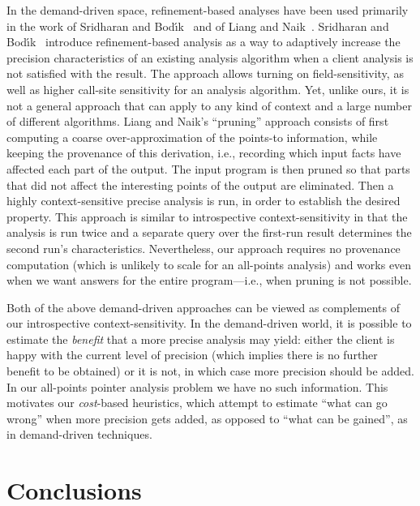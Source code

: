 In the demand-driven space, refinement-based analyses have been used
primarily in the work of Sridharan and Bod\'{\i}k~\cite{pldi:2006:Sridharan} and
of Liang and Naik~\cite{pldi:2011:Liang}.  Sridharan
and Bod\'{\i}k~\cite{pldi:2006:Sridharan} introduce refinement-based analysis as a
way to adaptively increase the precision characteristics of an
existing analysis algorithm when a client analysis is not satisfied
with the result. The approach allows turning on field-sensitivity, as
well as higher call-site sensitivity for an analysis algorithm. Yet,
unlike ours, it is not a general approach that can apply to any kind
of context and a large number of different algorithms.  Liang and
Naik's ``pruning'' approach \cite{pldi:2011:Liang}
consists of first computing a coarse over-approximation of the
points-to information, while keeping the provenance of this
derivation, i.e., recording which input facts have affected each part
of the output. The input program is then pruned so that parts that did
not affect the interesting points of the output are eliminated. Then a
highly context-sensitive precise analysis is run, in order to
establish the desired property. This approach is similar to
introspective context-sensitivity in that the analysis is run twice
and a separate query over the first-run result determines the second
run's characteristics.  Nevertheless, our approach requires no
provenance computation (which is unlikely to scale for an all-points
analysis) and works even when we want answers for the entire
program---i.e., when pruning is not possible.

Both of the above demand-driven approaches can be viewed as
complements of our introspective context-sensitivity. In the
demand-driven world, it is possible to estimate the \emph{benefit}
that a more precise analysis may yield: either the client is happy
with the current level of precision (which implies there is no further
benefit to be obtained) or it is not, in which case more precision
should be added. In our all-points pointer analysis problem we have no
such information. This motivates our \emph{cost}-based heuristics,
which attempt to estimate ``what can go wrong'' when more precision
gets added, as opposed to ``what can be gained'', as in demand-driven
techniques.

\section{Conclusions}

